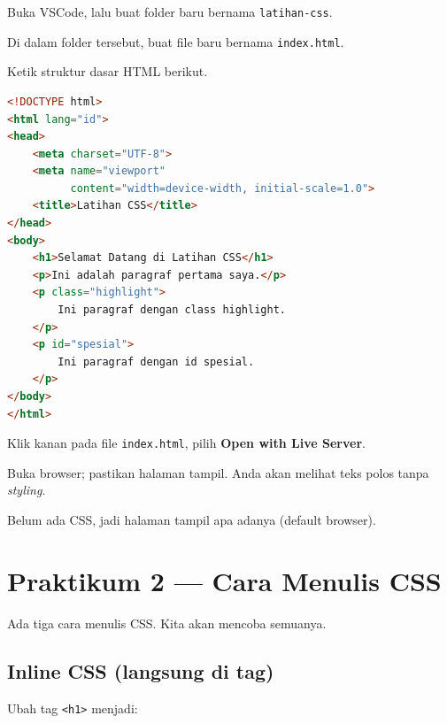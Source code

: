 \begin{langkah}
  \item Buka VSCode, lalu buat folder baru bernama \texttt{latihan-css}.
  \item Di dalam folder tersebut, buat file baru bernama \texttt{index.html}.
  \item Ketik struktur dasar HTML berikut.
\end{langkah}

\begin{lstlisting}[language=HTML, caption={Struktur dasar HTML}, label={lst:html-dasar}]
<!DOCTYPE html>
<html lang="id">
<head>
    <meta charset="UTF-8">
    <meta name="viewport"
          content="width=device-width, initial-scale=1.0">
    <title>Latihan CSS</title>
</head>
<body>
    <h1>Selamat Datang di Latihan CSS</h1>
    <p>Ini adalah paragraf pertama saya.</p>
    <p class="highlight">
        Ini paragraf dengan class highlight.
    </p>
    <p id="spesial">
        Ini paragraf dengan id spesial.
    </p>
</body>
</html>
\end{lstlisting}

\begin{langkah}
  \item Klik kanan pada file \texttt{index.html}, pilih \textbf{Open with Live Server}.
  \item Buka browser; pastikan halaman tampil. Anda akan melihat teks polos tanpa \emph{styling}.
\end{langkah}

\begin{catatan}
Belum ada CSS, jadi halaman tampil apa adanya (default browser).
\end{catatan}

\section{Praktikum 2 --- Cara Menulis CSS}
\label{sec:praktik-2}

Ada tiga cara menulis CSS. Kita akan mencoba semuanya.

\subsection{Inline CSS (langsung di tag)}
\label{subsec:inline-css}

\begin{langkah}
  \item Ubah tag \texttt{<h1>} menjadi:
\end{langkah}

